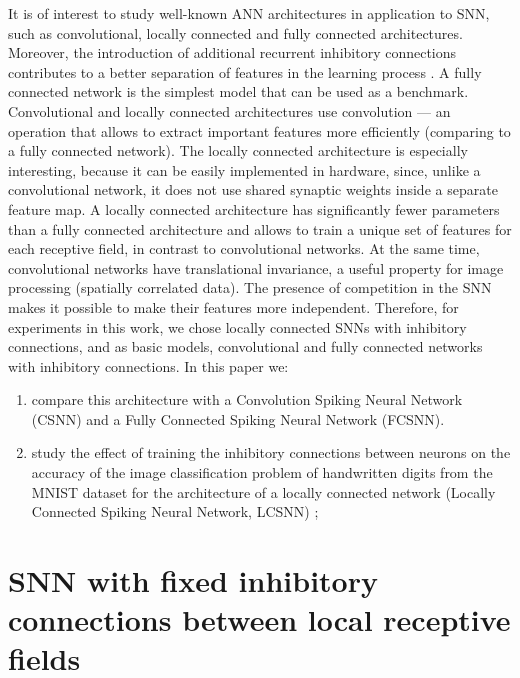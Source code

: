 \documentclass[a4paper,10pt]{article}
\begin{document}
It is of interest to study well-known ANN architectures in application to SNN, such as convolutional, locally connected and fully connected \parencite{Khan_2020} architectures. Moreover, the introduction of additional recurrent inhibitory connections contributes to a better separation of features in the learning process \parencite{MaxActiv1, MaxActiv2}. A fully connected network is the simplest model that can be used as a benchmark. Convolutional and locally connected architectures use convolution --- an operation that allows to extract important features more efficiently (comparing to a fully connected network). The locally connected architecture is especially interesting, because it can be easily implemented in hardware, since, unlike a convolutional network, it does not use shared synaptic weights  inside a separate feature map. A locally connected architecture has significantly fewer parameters than a fully connected architecture and allows to train a unique set of features for each receptive field, in contrast to convolutional networks. At the same time, convolutional networks have translational invariance, a useful property for image processing (spatially correlated data). The presence of competition in the SNN makes it possible to make their features more independent. Therefore, for experiments in this work, we chose locally connected SNNs with inhibitory connections, and as basic models, convolutional and fully connected networks with inhibitory connections. In this paper we:

\begin{enumerate}[i]

\item compare this architecture with a Convolution Spiking Neural Network (CSNN) and a Fully Connected Spiking Neural Network (FCSNN).

\item study the effect of training the inhibitory connections \parencite{MaxActiv1, MaxActiv2, hardware_survey} between neurons on the accuracy of the image classification problem of handwritten digits from the MNIST \parencite{MNIST} dataset for the architecture of a locally connected network (Locally Connected Spiking Neural Network, LCSNN) \parencite{saunders2019locally};

\end{enumerate}

\clearpage

\section{SNN with fixed inhibitory connections between local receptive fields}
\end{document}
